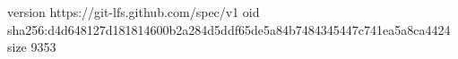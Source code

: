 version https://git-lfs.github.com/spec/v1
oid sha256:d4d648127d181814600b2a284d5ddf65de5a84b7484345447c741ea5a8ca4424
size 9353
